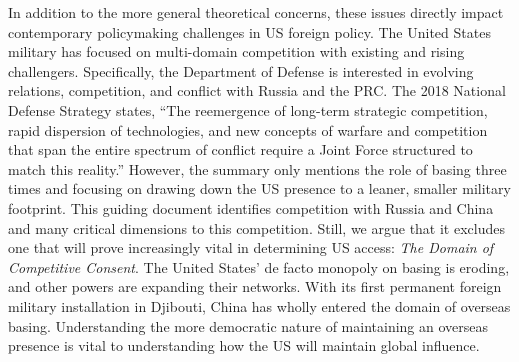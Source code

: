 In addition to the more general theoretical concerns, these issues directly impact contemporary policymaking challenges in US foreign policy. The United States military has focused on multi-domain competition with existing and rising challengers. Specifically, the Department of Defense is interested in evolving relations, competition, and conflict with Russia and the PRC. The 2018 National Defense Strategy states, ``The reemergence of long-term strategic competition, rapid dispersion of technologies, and new concepts of warfare and competition that span the entire spectrum of conflict require a Joint Force structured to match this reality.''\autocite[p. 1]{Mattis2018} However, the summary only mentions the role of basing three times and focusing on drawing down the US presence to a leaner, smaller military footprint. This guiding document identifies competition with Russia and China and many critical dimensions to this competition. Still, we argue that it excludes one that will prove increasingly vital in determining US access: \textit{The Domain of Competitive Consent}. The United States' de facto monopoly on basing is eroding, and other powers are expanding their networks. With its first permanent foreign military installation in Djibouti, China has wholly entered the domain of overseas basing. Understanding the more democratic nature of maintaining an overseas presence is vital to understanding how the US will maintain global influence.

